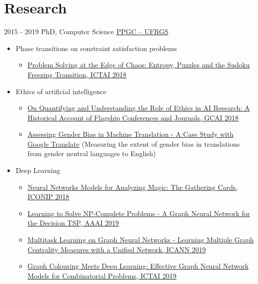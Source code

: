 \documentclass[letterpaper]{twentysecondcv} %
\begin{document}
\section{Research}
\begin{twenty}
	\twentyitem
    	{2015 - 2019}
        {PhD, Computer Science}
        {\href{http://www.inf.ufrgs.br/ppgc/en}{PPGC -- UFRGS}}
        {}
        {
        {
        \begin{itemize}
            \item Phase transitions on constraint satisfaction problems
            \begin{itemize}
                \item {\small \color{pblue} \href{https://ieeexplore.ieee.org/document/8576107/}{Problem Solving at the Edge of Chaos: Entropy, Puzzles and the Sudoku Freezing Transition, ICTAI 2018}}
            \end{itemize}
            \item Ethics of artificial intelligence
            \begin{itemize}
                \item {\small {\color{pblue} \href{http://www.easychair.org/publications/paper/Z7D4}{On Quantifying and Understanding the Role of Ethics in AI Research: A Historical Account of Flagship Conferences and Journals, GCAI 2018}}}
                \item {\small {\color{pblue} \href{http://arxiv.org/abs/1809.02208}{Assessing Gender Bias in Machine Translation - A Case Study with Google Translate}} (Measuring the extent of gender bias in translations from gender neutral languages to English)}
            \end{itemize}
            \item Deep Learning
            \begin{itemize}
                \item {\small {\color{pblue} \href{https://doi.org/10.1007/978-3-030-04179-3_20}{Neural Networks Models for Analyzing Magic: The Gathering Cards, ICONIP 2018}}}
                \item {\small {\color{pblue} \href{http://arxiv.org/abs/1809.02721}{Learning to Solve NP-Complete Problems - A Graph Neural Network for the Decision TSP, AAAI 2019}}}
                \item {\small {\color{pblue} \href{http://arxiv.org/abs/1809.07695}{Multitask Learning on Graph Neural Networks - Learning Multiple Graph Centrality Measures with a Unified Network, ICANN 2019}}}
                \item {\small {\color{pblue} \href{https://arxiv.org/pdf/1903.04598.pdf}{Graph Colouring Meets Deep Learning: Effective Graph Neural Network Models for Combinatorial Problems, ICTAI 2019}}}

\end{itemize}
\end{itemize}}}
\end{twenty}
\end{document}
